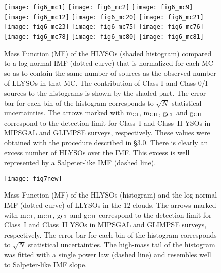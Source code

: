 \documentclass[iop]{emulateapj}
\begin{document}
\begin{figure*}[ht!]
     \begin{center}
\texttt{[image: fig6\_mc1]} 
\texttt{[image: fig6\_mc2]} 
\texttt{[image: fig6\_mc9]} \\
\texttt{[image: fig6\_mc12]} 
\texttt{[image: fig6\_mc20]} 
\texttt{[image: fig6\_mc21]} \\
\texttt{[image: fig6\_mc23]} 
\texttt{[image: fig6\_mc75]} 
\texttt{[image: fig6\_mc76]} \\
\texttt{[image: fig6\_mc78]} 
\texttt{[image: fig6\_mc80]} 
\texttt{[image: fig6\_mc81]} \\
    \end{center}
    \caption{
Mass Function (MF) of the HLYSOs (shaded histogram) compared to a log-normal 
\citet{chabrier03} IMF (dotted curve) that is normalized for each MC so as 
to contain the same number of sources as the observed number of LLYSOs in 
that MC. The contribution of Class I and Class 0/I sources to the histograms
is shown by the shaded part. The error bar for each bin of the histogram 
corresponds to $\sqrt{N}$ statistical uncertainties. 
The arrows marked with m$_{\rm CI}$, m$_{\rm CII}$,
g$_{\rm CI}$ and g$_{\rm CII}$ correspond to the detection limit for Class~I 
and Class~II YSOs in MIPSGAL and GLIMPSE surveys, respectively.
{ These values were obtained with the procedure described in \S3.0.}
There is clearly an excess number of HLYSOs over the \citet{chabrier03} IMF.
This excess is well represented by a Salpeter-like IMF (dashed line).
}
\label{figure6}
\end{figure*}


\begin{figure}[ht!]
     \begin{center}
            \texttt{[image: fig7new]}
    \end{center}
\caption{ 
Mass Function (MF) of the HLYSOs (histogram) and the log-normal IMF 
(dotted curve) of LLYSOs in the 12 clouds.  
The arrows marked with m$_{\rm CI}$, m$_{\rm CII}$,
g$_{\rm CI}$ and g$_{\rm CII}$ correspond to the detection limit for Class~I 
and Class~II YSOs in MIPSGAL and GLIMPSE surveys, respectively.
The error bar for each bin of the 
histogram corresponds to $\sqrt{N}$ statistical uncertainties.
The high-mass tail of the histogram was fitted with a single power law 
(dashed line) and resembles well to Salpeter-like IMF slope.}
   \label{figure7}
\end{figure}
\end{document}
